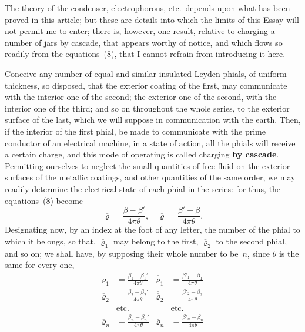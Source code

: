 \documentclass[12pt,notitlepage]{amsart}
\let\Emphasis\textbf
\renewcommand{\rho}{\varrho}
\begin{document}
The theory of the condenser, electrophorous, etc.\ depends upon what
has been proved in this article; but these are details into which the limits of
this Essay will not permit me to enter; there is, however, one result, relative
to charging a number of jars by cascade, that appears worthy of notice,
and which flows so readily from the equations~(8), that I cannot refrain from
introducing it here.

Conceive any number of equal and similar insulated Leyden phials, of
uniform thickness, so disposed, that the exterior coating of the first, may 
communicate with the interior one of the second; the exterior one of the second,
with the interior one of the third; and so on throughout the whole series, to
the exterior surface of the last,
which we will suppose in communication with the
earth. Then, if the interior of the first phial, be made to communicate with
the prime conductor of an electrical machine,
in a state of action, all the phials
will receive a certain charge, and this mode of operating is called charging
\Emphasis{by cascade}. Permitting ourselves
to neglect the small quantities of free fluid on
the exterior surfaces of the metallic coatings, and other quantities of the same
order, we may readily determine
the electrical state of each phial in the series:
for thus, the equations~(8) become
\[
\overline\rho=\frac{\beta-\beta'}{4\pi\theta},\quad
\overline{\overline\rho}=\frac{\beta'-\beta}{4\pi\theta}.
\]
Designating now, by an index at the foot of any letter, the number of the
phial to which it belongs, so that,
$\overline\rho_1$ may belong to the first,
$\overline\rho_2$ to the second
phial, and so on; we shall have, by supposing their whole number to be~$n$,
since $\theta$ is the same for every one,
\begin{align*}
\overline\rho_1 &=\frac{\beta_1-\beta_1'}{4\pi\theta} &
\overline{\overline\rho}_1 &=\frac{\beta'_1-\beta_1}{4\pi\theta}\\
\overline\rho_2 &=\frac{\beta_2-\beta_2'}{4\pi\theta} &
\overline{\overline\rho}_2 &=\frac{\beta'_2-\beta_2}{4\pi\theta}\\
&\text{etc.} &&\text{etc.}\\
\overline\rho_n &=\frac{\beta_n-\beta_n'}{4\pi\theta} &
\overline{\overline\rho}_n &=\frac{\beta'_n-\beta_n}{4\pi\theta}
\end{align*}
\end{document}
